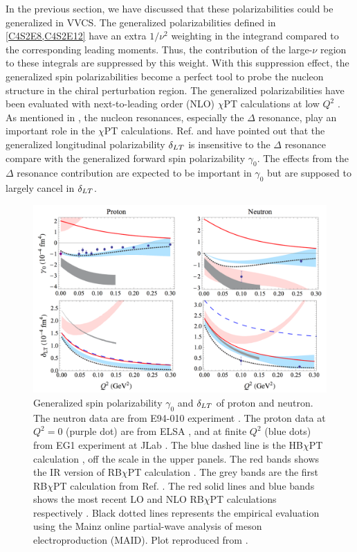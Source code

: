 In the previous section, we have discussed that these polarizabilities could be generalized in VVCS. The generalized polarizabilities defined in \cref{C4S2E8,C4S2E12} have an extra $1/\nu^2$ weighting in the integrand compared to the corresponding leading moments. Thus, the contribution of the large-$\nu$ region to these integrals are suppressed by this weight. With this suppression effect, the generalized spin polarizabilities become a perfect tool to probe the nucleon structure in the chiral perturbation region. The generalized polarizabilities have been evaluated with next-to-leading order (NLO) $\chi$PT calculations at low $Q^2$ \cite{Bernard2003,Kao2003}. As mentioned in , the nucleon resonances, especially the $\Delta$ resonance, play an important role in the $\chi$PT calculations. Ref. \cite{Bernard2003} and \cite{Kao2003} have pointed out that the generalized longitudinal polarizability $\dlt$ is insensitive to the $\Delta$ resonance compare with the generalized forward spin polarizability $\gamma_0$. The effects from the $\Delta$ resonance contribution are expected to be important in $\gamma_0$ but are supposed to largely cancel in $\dlt$.

\begin{figure}[tb!]
  \centering
  \includegraphics[width=\textwidth]{figs/g0_dlt_xpt.png}
  \caption[Generalized spin polarizability $\gamma_0$ and $\dlt$ of proton and neutron.]{Generalized spin polarizability $\gamma_0$ and $\dlt$ of proton and neutron. The neutron data are from E94-010 experiment \cite{Amarian2004b}. The proton data at $Q^2=0$ (purple dot) are from ELSA \cite{Dutz2003}, and at finite $Q^2$ (blue dots) from EG1 experiment at JLab \cite{Prok2009}. The blue dashed line is the HB$\chi$PT calculation \cite{Kao2003}, off the scale in the upper panels. The red bands shows the IR version of RB$\chi$PT calculation \cite{Bernard2003}. The grey bands are the first RB$\chi$PT calculation from Ref. \cite{Bernard2013}. The red solid lines and blue bands shows the most recent LO and NLO RB$\chi$PT calculations respectively \cite{Lensky2014}. Black dotted lines represents the empirical evaluation using the Mainz online partial-wave analysis of meson electroproduction (MAID). Plot reproduced from \cite{Lensky2014}. \label{C4S2F1}}
\end{figure}

